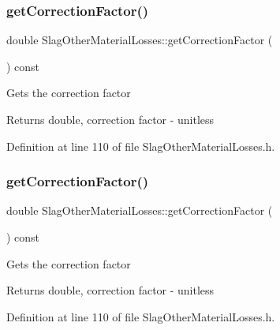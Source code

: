 \subsubsection{\texorpdfstring{get\+Correction\+Factor()}{getCorrectionFactor()}\hspace{0.1cm}{\footnotesize\ttfamily [1/3]}}
{\footnotesize\ttfamily double Slag\+Other\+Material\+Losses\+::get\+Correction\+Factor (\begin{DoxyParamCaption}{ }\end{DoxyParamCaption}) const\hspace{0.3cm}{\ttfamily [inline]}}

Gets the correction factor \begin{DoxyReturn}{Returns}
double, correction factor -\/ unitless 
\end{DoxyReturn}


Definition at line 110 of file Slag\+Other\+Material\+Losses.\+h.

\mbox{\label{class_slag_other_material_losses_a920bbc2da2ba90416e86573830eee2cb}} 
\subsubsection{\texorpdfstring{get\+Correction\+Factor()}{getCorrectionFactor()}\hspace{0.1cm}{\footnotesize\ttfamily [2/3]}}
{\footnotesize\ttfamily double Slag\+Other\+Material\+Losses\+::get\+Correction\+Factor (\begin{DoxyParamCaption}{ }\end{DoxyParamCaption}) const\hspace{0.3cm}{\ttfamily [inline]}}

Gets the correction factor \begin{DoxyReturn}{Returns}
double, correction factor -\/ unitless 
\end{DoxyReturn}


Definition at line 110 of file Slag\+Other\+Material\+Losses.\+h.

\mbox{\label{class_slag_other_material_losses_a920bbc2da2ba90416e86573830eee2cb}} 
